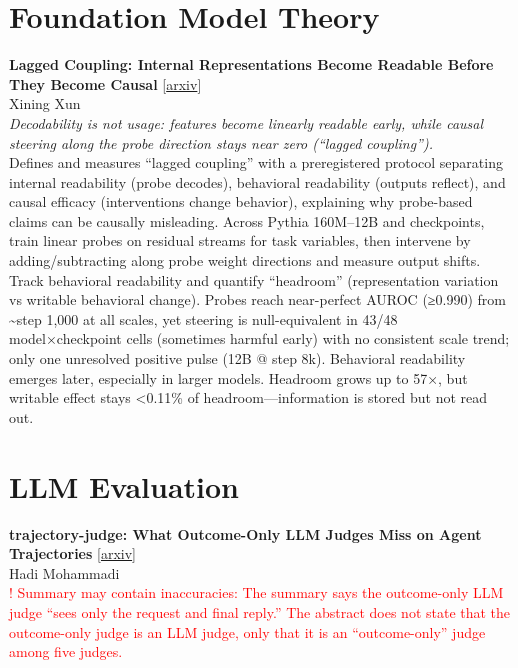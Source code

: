\documentclass[12pt,letterpaper]{article}
\begin{document}
\medskip


\section*{Foundation Model Theory}

{\small\textbf{Lagged Coupling: Internal Representations Become Readable Before They Become Causal}} {\scriptsize[\href{https://arxiv.org/abs/2609.01048}{arxiv}]}\\
{\scriptsize Xining Xun}\\

{\small\textit{Decodability is not usage: features become linearly readable early, while causal steering along the probe direction stays near zero (``lagged coupling'').}}\\[1pt]
{\footnotesize Defines and measures ``lagged coupling'' with a preregistered protocol separating internal readability (probe decodes), behavioral readability (outputs reflect), and causal efficacy (interventions change behavior), explaining why probe-based claims can be causally misleading. Across Pythia 160M--12B and checkpoints, train linear probes on residual streams for task variables, then intervene by adding/subtracting along probe weight directions and measure output shifts. Track behavioral readability and quantify ``headroom'' (representation variation vs writable behavioral change). Probes reach near-perfect AUROC (≥0.990) from \textasciitilde{}step 1,000 at all scales, yet steering is null-equivalent in 43/48 model×checkpoint cells (sometimes harmful early) with no consistent scale trend; only one unresolved positive pulse (12B @ step 8k). Behavioral readability emerges later, especially in larger models. Headroom grows up to 57×, but writable effect stays <0.11\% of headroom---information is stored but not read out.}

\medskip


\section*{LLM Evaluation}

{\small\textbf{trajectory-judge: What Outcome-Only LLM Judges Miss on Agent Trajectories}} {\scriptsize[\href{https://arxiv.org/abs/2609.00038}{arxiv}]}\\
{\scriptsize Hadi Mohammadi}\\

{\scriptsize\textcolor{red}{! Summary may contain inaccuracies: The summary says the outcome-only LLM judge ``sees only the request and final reply.'' The abstract does not state that the outcome-only judge is an LLM judge, only that it is an ``outcome-only'' judge among five judges.}}\\[1pt]
\end{document}
